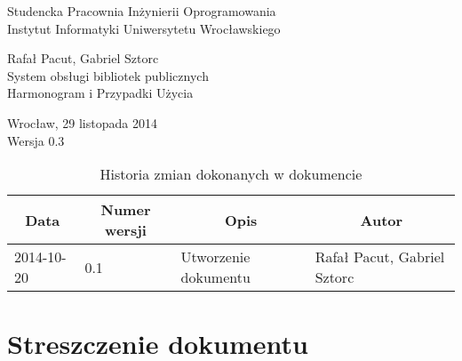 \documentclass[11pt,a4paper]{article}
\begin{document}
%
%
\begin{center}
	\Large
	Studencka Pracownia Inżynierii Oprogramowania \\[0.5cm]
	Instytut Informatyki Uniwersytetu Wrocławskiego 

	\vspace*{\fill}
	Rafał Pacut, Gabriel Sztorc \\[1cm]
	{\Huge System obsługi bibliotek publicznych} \\[1cm]
	Harmonogram i Przypadki Użycia
	\vspace*{\fill}

	Wrocław, 29 listopada 2014 \\[0.5cm]
	Wersja 0.3
\end{center}
\newpage
{}
\setcounter{page}{2}
%
%

%
%
\begin{table}
\caption{Historia zmian dokonanych w dokumencie}
\begin{tabular}{|l|l|l|l|}
    \hline
    \multicolumn{1}{|c|}{Data} & \multicolumn{1}{c|}{Numer wersji} & 
        \multicolumn{1}{c|}{Opis} & \multicolumn{1}{c|}{Autor} \\
    \hline \hline
    2014-10-20 & 0.1 & Utworzenie dokumentu & Rafał Pacut, Gabriel Sztorc \\
    \hline
\end{tabular}
\end{table}
%
%

\tableofcontents

\newpage

\setcounter{section}{-1}
\section{Streszczenie dokumentu}

\end{document}
